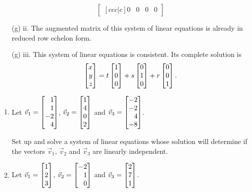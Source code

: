 \begin{exercises}
\begin{problist}
\begin{solution}
\begin{enumerate}
\[\begin{bmatrix}[ccc|c]
						0 & 0 & 0 & 0
					\end{bmatrix}
				\]
				\item[(g) ii.]
				The augmented matrix of this system of linear equations is already in reduced row echelon form.
				\item[(g) iii.]
				This system of linear equations is consistent. Its complete solution is
				\[
					\mat{x\\y\\z}=t\mat{1\\0\\0}+s\mat{0\\1\\0}+r\mat{0\\0\\1}.
				\]
			\end{enumerate}
		\end{solution}

		\prob 
		\label{QSETUPEQUATIONS}
		\begin{enumerate}
			\item Let $\vec v_{1}=\mat{1\\1\\-2\\4}$,
			$\vec v_{2}=\mat{1\\4\\0\\2}$ and
			$\vec v_{3}=\mat{-2\\-2\\4\\-8}$.
			
			Set up and solve a system of linear equations whose solution
			will determine if the vectors $\vec v_{1}$, $\vec v_{2}$ and $\vec
			v_{3}$ are linearly independent.
			
			\item Let $\vec v_{1}=\mat{1\\2\\3}$, $\vec v_{2}=\mat{-2\\1\\0}$
			and $\vec v_{3}=\mat{2\\7\\1}$.
			

\end{enumerate}
\end{problist}
\end{exercises}
